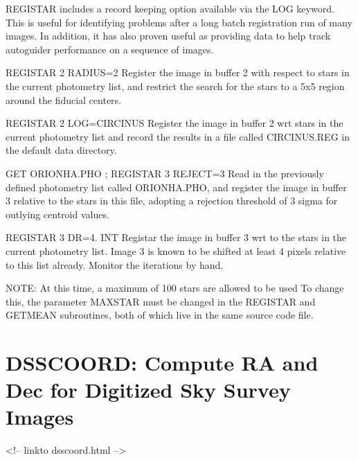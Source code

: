 REGISTAR includes a record keeping option available via the LOG keyword.
This is useful for identifying problems after a long batch registration run
of many images.  In addition, it has also proven useful as providing data
to help track autoguider performance on a sequence of images.

\begin{example}
  \item[REGISTAR 2 RADIUS=2\hfill]{Register the image in buffer 2 with
       respect to stars in the current photometry list, and restrict the
       search for the stars to a 5x5 region around the fiducial centers.}

  \item[REGISTAR 2 LOG=CIRCINUS \hfill]{Register the image in buffer 2 wrt
       stars in the current photometry list and record the results in a
       file called CIRCINUS.REG in the default data directory.}

  \item[GET ORIONHA.PHO ; REGISTAR 3 REJECT=3\hfill]{ Read in the
       previously defined photometry list called ORIONHA.PHO, and register
       the image in buffer 3 relative to the stars in this file, adopting a
       rejection threshold of 3 sigma for outlying centroid values.}

  \item[REGISTAR 3 DR=4. INT\hfill]{Registar the image in buffer 3 wrt to
       the stars in the current photometry list.  Image 3 is known to be
       shifted at least 4 pixels relative to this list already.  Monitor
       the iterations by hand.}
\end{example}

NOTE: At this time, a maximum of 100 stars are allowed to be used To change
this, the parameter MAXSTAR must be changed in the REGISTAR and GETMEAN
subroutines, both of which live in the same source code file.

\section{DSSCOORD: Compute RA and Dec for Digitized Sky Survey Images}
\begin{rawhtml}
<!-- linkto dsscoord.html -->
\end{rawhtml}


